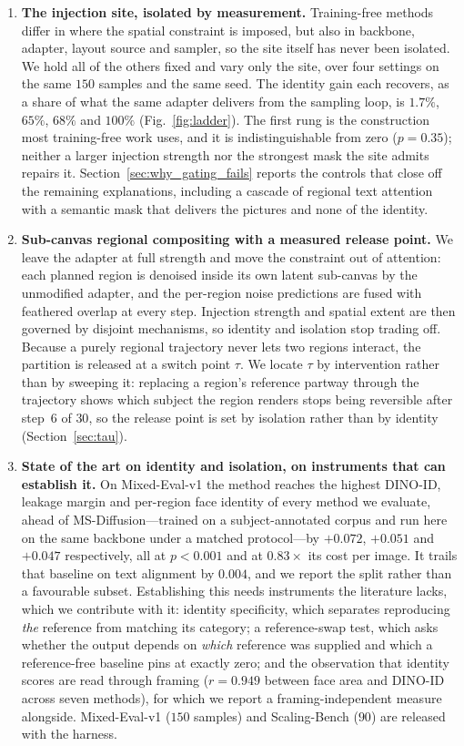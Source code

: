 \documentclass[10pt,twocolumn,letterpaper]{article}
\begin{document}
\begin{enumerate}

\item \textbf{The injection site, isolated by measurement.}
Training-free methods differ in where the spatial constraint is imposed, but
also in backbone, adapter, layout source and sampler, so the site itself has
never been isolated.  We hold all of the others fixed and vary only the site,
over four settings on the same $150$ samples and the same seed.  The identity
gain each recovers, as a share of what the same adapter delivers from the
sampling loop, is $1.7\%$, $65\%$, $68\%$ and $100\%$
(Fig.~\ref{fig:ladder}).  The first rung is the construction most
training-free work uses, and it is indistinguishable from zero
($p{=}0.35$); neither a larger injection strength nor the strongest mask the
site admits repairs it.  Section~\ref{sec:why_gating_fails} reports the
controls that close off the remaining explanations, including a cascade of
regional text attention with a semantic mask that delivers the pictures and
none of the identity.

\item \textbf{Sub-canvas regional compositing with a measured release point.}
We leave the adapter at full strength and move the constraint out of
attention: each planned region is denoised inside its own latent sub-canvas
by the unmodified adapter, and the per-region noise predictions are fused
with feathered overlap at every step.  Injection strength and spatial extent
are then governed by disjoint mechanisms, so identity and isolation stop
trading off.  Because a purely regional trajectory never lets two regions
interact, the partition is released at a switch point $\tau$.  We locate
$\tau$ by intervention rather than by sweeping it: replacing a region's
reference partway through the trajectory shows which subject the region
renders stops being reversible after step~$6$ of $30$, so the release point
is set by isolation rather than by identity (Section~\ref{sec:tau}).

\item \textbf{State of the art on identity and isolation, on instruments that
can establish it.}
On Mixed-Eval-v1 the method reaches the highest DINO-ID, leakage margin and
per-region face identity of every method we evaluate, ahead of
MS-Diffusion---trained on a subject-annotated corpus and run here on the same
backbone under a matched protocol---by $+0.072$, $+0.051$ and $+0.047$
respectively, all at $p{<}0.001$ and at $0.83\times$ its cost per image.  It
trails that baseline on text alignment by $0.004$, and we report the split
rather than a favourable subset.  Establishing this needs instruments the
literature lacks, which we contribute with it: identity specificity, which
separates reproducing \emph{the} reference from matching its category; a
reference-swap test, which asks whether the output depends on \emph{which}
reference was supplied and which a reference-free baseline pins at exactly
zero; and the observation that identity scores are read through framing
($r{=}0.949$ between face area and DINO-ID across seven methods), for which
we report a framing-independent measure alongside.  Mixed-Eval-v1 ($150$
samples) and Scaling-Bench ($90$) are released with the harness.


\end{enumerate}
\end{document}
